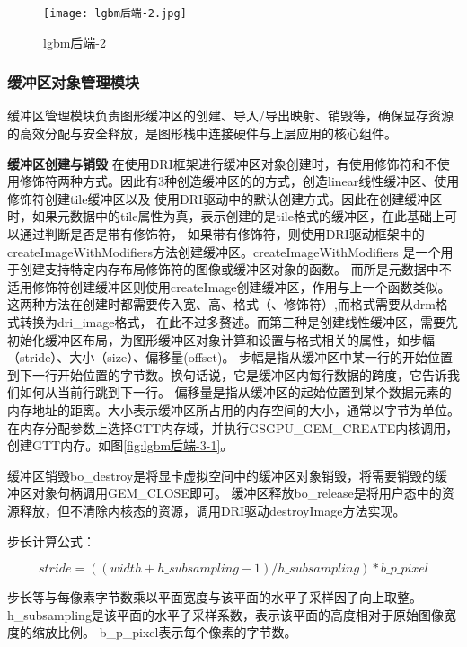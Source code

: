 \begin{figure}[h]
  \centering
  \texttt{[image: lgbm后端-2.jpg]}
  \caption{lgbm后端-2}
  \label{fig:lgbm后端-2}
\end{figure}  

\subsubsection{缓冲区对象管理模块}

缓冲区管理模块负责图形缓冲区的创建、导入/导出映射、销毁等，确保显存资源的高效分配与安全释放，是图形栈中连接硬件与上层应用的核心组件。

\textbf{缓冲区创建与销毁}
在使用DRI框架进行缓冲区对象创建时，有使用修饰符和不使用修饰符两种方式。因此有3种创造缓冲区的的方式，创造linear线性缓冲区、使用修饰符创建tile缓冲区以及
使用DRI驱动中的默认创建方式。因此在创建缓冲区时，如果元数据中的tile属性为真，表示创建的是tile格式的缓冲区，在此基础上可以通过判断是否是带有修饰符，
如果带有修饰符，则使用DRI驱动框架中的createImageWithModifiers方法创建缓冲区。createImageWithModifiers 是一个用于创建支持特定内存布局修饰符的图像或缓冲区对象的函数。
而所是元数据中不适用修饰符创建缓冲区则使用createImage创建缓冲区，作用与上一个函数类似。这两种方法在创建时都需要传入宽、高、格式（、修饰符）,而格式需要从drm格式转换为dri\_image格式，
在此不过多赘述。而第三种是创建线性缓冲区，需要先初始化缓冲区布局，为图形缓冲区对象计算和设置与格式相关的属性，如步幅（stride）、大小（size）、偏移量(offset)。
步幅是指从缓冲区中某一行的开始位置到下一行开始位置的字节数。换句话说，它是缓冲区内每行数据的跨度，它告诉我们如何从当前行跳到下一行。
偏移量是指从缓冲区的起始位置到某个数据元素的内存地址的距离。大小表示缓冲区所占用的内存空间的大小，通常以字节为单位。
在内存分配参数上选择GTT内存域，并执行GSGPU\_GEM\_CREATE内核调用，创建GTT内存。如图\ref{fig:lgbm后端-3-1}。

缓冲区销毁bo\_destroy是将显卡虚拟空间中的缓冲区对象销毁，将需要销毁的缓冲区对象句柄调用GEM\_CLOSE即可。
缓冲区释放bo\_release是将用户态中的资源释放，但不清除内核态的资源，调用DRI驱动destroyImage方法实现。

步长计算公式：

\begin{equation}
  stride=((width+h\_subsampling-1)/h\_subsampling)*b\_p\_pixel
\end{equation}

步长等与每像素字节数乘以平面宽度与该平面的水平子采样因子向上取整。h\_subsampling是该平面的水平子采样系数，表示该平面的高度相对于原始图像宽度的缩放比例。
b\_p\_pixel表示每个像素的字节数。

